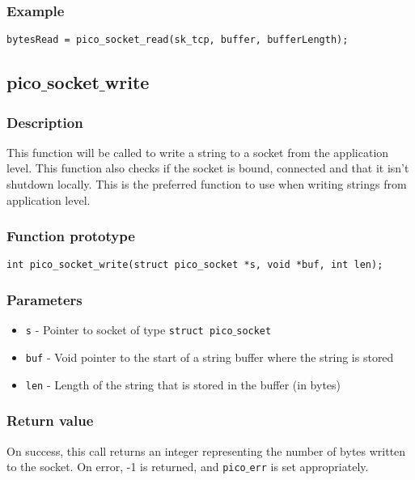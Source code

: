 \subsubsection*{Example}
\begin{verbatim}
bytesRead = pico_socket_read(sk_tcp, buffer, bufferLength);
\end{verbatim}



\subsection{pico$\_$socket$\_$write}

\subsubsection*{Description}
This function will be called to write a string to a socket from the application level.
This function also checks if the socket is bound, connected and that it isn't shutdown
locally. This is the preferred function to use when writing strings from application
level. 

\subsubsection*{Function prototype}
\begin{verbatim}
int pico_socket_write(struct pico_socket *s, void *buf, int len);
\end{verbatim}

\subsubsection*{Parameters}
\begin{itemize}[noitemsep]
\item \texttt{s} - Pointer to socket of type \texttt{struct pico$\_$socket}
\item \texttt{buf} - Void pointer to the start of a string buffer where the string is stored
\item \texttt{len} - Length of the string that is stored in the buffer (in bytes)
\end{itemize}

\subsubsection*{Return value}
On success, this call returns an integer representing the number of bytes written to the socket.
On error, -1 is returned, and \texttt{pico$\_$err} is set appropriately.

